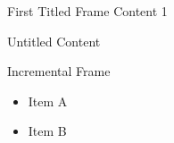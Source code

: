 \documentclass[14pt,t]{beamer}
\begin{document}
\begin{frame}{First Titled Frame}
Content 1
\end{frame}
\begin{frame}
Untitled Content
\end{frame}
\begin{frame}{Incremental Frame}
\begin{itemize}
\item<1-> Item A
\item<2-> Item B
\end{itemize}
\end{frame}
\end{document}
